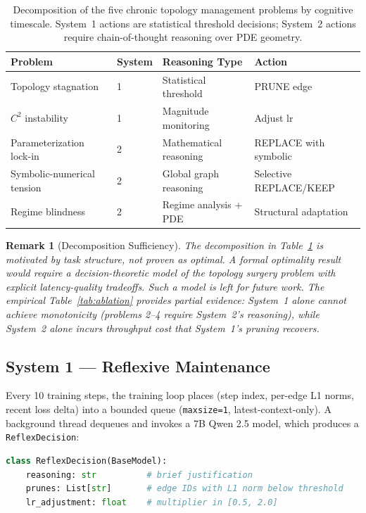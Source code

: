 \documentclass[11pt,a4paper]{article}
\newtheorem{remark}{Remark}
\begin{document}
\begin{table}[ht]
\centering
\caption{Decomposition of the five chronic topology management problems by cognitive
timescale. System~1 actions are statistical threshold decisions; System~2 actions
require chain-of-thought reasoning over PDE geometry.}
\begin{tabular}{@{}llll@{}}
\toprule
Problem & System & Reasoning Type & Action \\
\midrule
Topology stagnation & 1 & Statistical threshold & PRUNE edge \\
$C^2$ instability & 1 & Magnitude monitoring & Adjust lr \\
Parameterization lock-in & 2 & Mathematical reasoning & REPLACE with symbolic \\
Symbolic-numerical tension & 2 & Global graph reasoning & Selective REPLACE/KEEP \\
Regime blindness & 2 & Regime analysis $+$ PDE & Structural adaptation \\
\bottomrule
\end{tabular}
\label{tab:decomposition}
\end{table}

\begin{remark}[Decomposition Sufficiency]
The decomposition in Table~\ref{tab:decomposition} is motivated by task structure, not proven
as optimal. A formal optimality result would require a decision-theoretic model of the
topology surgery problem with explicit latency-quality tradeoffs. Such a model is left
for future work. The empirical Table~\ref{tab:ablation} provides partial evidence: System~1
alone cannot achieve monotonicity (problems 2--4 require System~2's reasoning), while
System~2 alone incurs throughput cost that System~1's pruning recovers.
\end{remark}

\subsection{System 1 --- Reflexive Maintenance}
\label{sec:agent:sys1}

Every 10 training steps, the training loop places (step index, per-edge L1 norms,
recent loss delta) into a bounded queue (\texttt{maxsize=1}, latest-context-only).
A background thread dequeues and invokes a 7B Qwen 2.5 model, which produces a
\texttt{ReflexDecision}:

\begin{lstlisting}[language=Python]
class ReflexDecision(BaseModel):
    reasoning: str          # brief justification
    prunes: List[str]       # edge IDs with L1 norm below threshold
    lr_adjustment: float    # multiplier in [0.5, 2.0]
\end{lstlisting}
\end{document}

